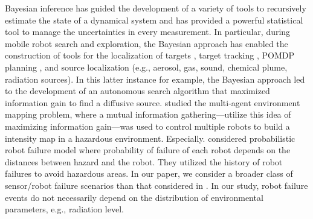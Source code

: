 \documentclass[letterpaper, 10 pt, conference]{ieeeconf}
\newcommand{\Ram}[1]{{\normalsize{\textbf{({\color{green}Ram:\ }#1)}}}}
\newcommand{\HJ}[1]{{\color{black}{#1}}}
\newcommand{\rood}[1]{{\color{red}{[#1]}}}
\newcommand{\HJP}[1]{{\normalsize{\textbf{({\color{blue}Hyongju:\ }#1)}}}}
\begin{document}
Bayesian inference has guided the development of a variety of tools to recursively estimate the state of a dynamical system and has \rood{, as a result,} provided a powerful statistical tool to manage the  uncertainties in every measurement.
In particular, during mobile robot search and exploration, the Bayesian approach has enabled the construction of tools for the localization of targets \cite{bourgault2003coordinated}, target tracking \cite{stone2013bayesian}, POMDP planning \cite{candido2010exploiting}, and source localization \cite{ristic2010information,valin2007robust} (e.g., aerosol, gas, sound, chemical plume, radiation sources). 
In this latter instance for example,  the Bayesian approach led to the development of an autonomous search algorithm that maximized information gain to find a diffusive source\cite{ristic2010information}.
\cite{cortez2011information,schwager2017multi} studied the multi-agent environment mapping problem, where  a mutual information gathering---utilize this idea of maximizing information gain---was used to control multiple robots to build a intensity map in a hazardous environment. Especially. \cite{schwager2017multi} considered probabilistic robot failure model where probability of failure of each robot depends on the distances between hazard and the robot. They utilized the history of robot failures to avoid hazardous areas. In our paper, we consider a broader class of sensor/robot failure scenarios than that considered in \cite{schwager2017multi}. In our study, robot failure events do not necessarily depend on the distribution of environmental parameters, e.g., radiation level. 
\end{document}
